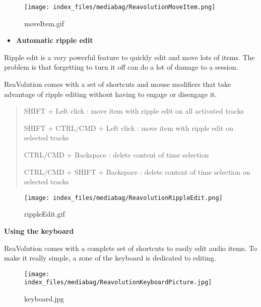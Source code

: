 \documentclass[
  letterpaper,
  DIV=11,
  numbers=noendperiod]{scrreport}
\providecommand{\tightlist}{%
  \setlength{\itemsep}{0pt}\setlength{\parskip}{0pt}}\usepackage{longtable,booktabs,array}
\begin{document}
\begin{figure}

{\centering \texttt{[image: index\_files/mediabag/ReavolutionMoveItem.png]}

}

\caption{moveItem.gif}

\end{figure}

\begin{itemize}
\tightlist
\item
  \textbf{Automatic ripple edit}
\end{itemize}

Ripple edit is a very powerful feature to quickly edit and move lots of
items. The problem is that forgetting to turn it off can do a lot of
damage to a session.

ReaVolution comes with a set of shortcuts and mouse modifiers that take
advantage of ripple editing without having to engage or disengage it.

\begin{quote}
SHIFT + Left click : move item with ripple edit on all activated tracks

SHIFT + CTRL/CMD + Left click : move item with ripple edit on selected
tracks

CTRL/CMD + Backspace : delete content of time selection

CTRL/CMD + SHIFT + Backspace : delete content of time selection on
selected tracks
\end{quote}

\begin{figure}

{\centering \texttt{[image: index\_files/mediabag/ReavolutionRippleEdit.png]}

}

\caption{rippleEdit.gif}

\end{figure}

\textbf{Using the keyboard}

ReaVolution comes with a complete set of shortcuts to easily edit audio
items. To make it really simple, a zone of the keyboard is dedicated to
editing.

\begin{figure}

{\centering \texttt{[image: index\_files/mediabag/ReavolutionKeyboardPicture.jpg]}

}

\caption{keyboard.jpg}

\end{figure}
\end{document}

